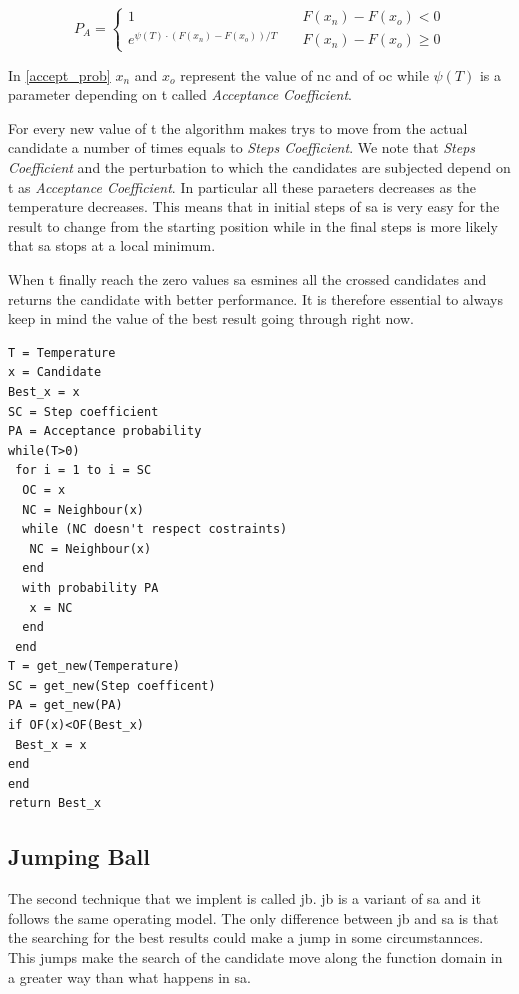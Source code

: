 \documentclass[journal]{IEEEtran}
\begin{document}
 \begin{equation}
 	\label{accept_prob}
	P_A = \begin{cases}
		1 & \quad F(x_n)-F(x_o) < 0 \\
		e^{\psi(T)\cdot(F(x_n)-F(x_o))/T } & \quad F(x_n)-F(x_o) \geq 0
\end{cases}
 \end{equation}

In \ref{accept_prob} $x_n$ and $x_o$ represent the value of \gls{nc} and of \gls{oc} while $\psi(T)$ is a parameter depending on \gls{t} called \textit{Acceptance Coefficient}.

For every new value of \gls{t} the algorithm makes trys to move from the actual candidate a number of times equals to \textit{Steps Coefficient}. We note that \textit{Steps Coefficient} and the perturbation to which the candidates are subjected depend on \gls{t} as \textit{Acceptance Coefficient}. In particular all these paraeters decreases as the temperature decreases. This means that in initial steps of \gls{sa} is very easy for the result to change from the starting position while in the final steps is more likely that \gls{sa} stops at a local minimum.

When \gls{t} finally reach the zero values \gls{sa} esmines all the crossed candidates and returns the candidate with better performance.
It is therefore essential to always keep in mind the value of the best result going through right now.

\pagebreak

\begin{lstlisting}[frame=single]
T = Temperature
x = Candidate
Best_x = x
SC = Step coefficient
PA = Acceptance probability
while(T>0)
 for i = 1 to i = SC
  OC = x
  NC = Neighbour(x)
  while (NC doesn't respect costraints)
   NC = Neighbour(x)
  end
  with probability PA
   x = NC
  end
 end
T = get_new(Temperature)
SC = get_new(Step coefficent)
PA = get_new(PA)
if OF(x)<OF(Best_x)
 Best_x = x
end
end
return Best_x
\end{lstlisting}  \label{code_sa}

\subsection{Jumping Ball}

The second technique that we implent is called \gls{jb}. \gls{jb} is a variant of \gls{sa} and it follows the same operating model. The only difference between \gls{jb} and \gls{sa} is that the searching for the best results could make a jump in some circumstannces. This jumps make the search of the candidate move along the function domain in a greater way than what happens in \gls{sa}.
\end{document}
